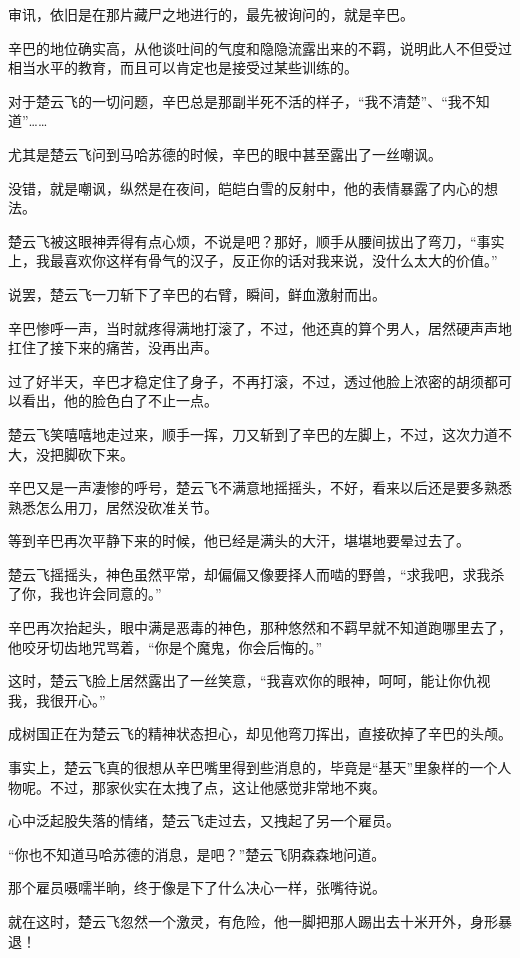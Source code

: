 审讯，依旧是在那片藏尸之地进行的，最先被询问的，就是辛巴。

辛巴的地位确实高，从他谈吐间的气度和隐隐流露出来的不羁，说明此人不但受过相当水平的教育，而且可以肯定也是接受过某些训练的。

对于楚云飞的一切问题，辛巴总是那副半死不活的样子，“我不清楚”、“我不知道”……

尤其是楚云飞问到马哈苏德的时候，辛巴的眼中甚至露出了一丝嘲讽。

没错，就是嘲讽，纵然是在夜间，皑皑白雪的反射中，他的表情暴露了内心的想法。

楚云飞被这眼神弄得有点心烦，不说是吧？那好，顺手从腰间拔出了弯刀，“事实上，我最喜欢你这样有骨气的汉子，反正你的话对我来说，没什么太大的价值。”

说罢，楚云飞一刀斩下了辛巴的右臂，瞬间，鲜血激射而出。

辛巴惨呼一声，当时就疼得满地打滚了，不过，他还真的算个男人，居然硬声声地扛住了接下来的痛苦，没再出声。

过了好半天，辛巴才稳定住了身子，不再打滚，不过，透过他脸上浓密的胡须都可以看出，他的脸色白了不止一点。

楚云飞笑嘻嘻地走过来，顺手一挥，刀又斩到了辛巴的左脚上，不过，这次力道不大，没把脚砍下来。

辛巴又是一声凄惨的呼号，楚云飞不满意地摇摇头，不好，看来以后还是要多熟悉熟悉怎么用刀，居然没砍准关节。

等到辛巴再次平静下来的时候，他已经是满头的大汗，堪堪地要晕过去了。

楚云飞摇摇头，神色虽然平常，却偏偏又像要择人而啮的野兽，“求我吧，求我杀了你，我也许会同意的。”

辛巴再次抬起头，眼中满是恶毒的神色，那种悠然和不羁早就不知道跑哪里去了，他咬牙切齿地咒骂着，“你是个魔鬼，你会后悔的。”

这时，楚云飞脸上居然露出了一丝笑意，“我喜欢你的眼神，呵呵，能让你仇视我，我很开心。”

成树国正在为楚云飞的精神状态担心，却见他弯刀挥出，直接砍掉了辛巴的头颅。

事实上，楚云飞真的很想从辛巴嘴里得到些消息的，毕竟是“基天”里象样的一个人物呢。不过，那家伙实在太拽了点，这让他感觉非常地不爽。

心中泛起股失落的情绪，楚云飞走过去，又拽起了另一个雇员。

“你也不知道马哈苏德的消息，是吧？”楚云飞阴森森地问道。

那个雇员嗫嚅半晌，终于像是下了什么决心一样，张嘴待说。

就在这时，楚云飞忽然一个激灵，有危险，他一脚把那人踢出去十米开外，身形暴退！

